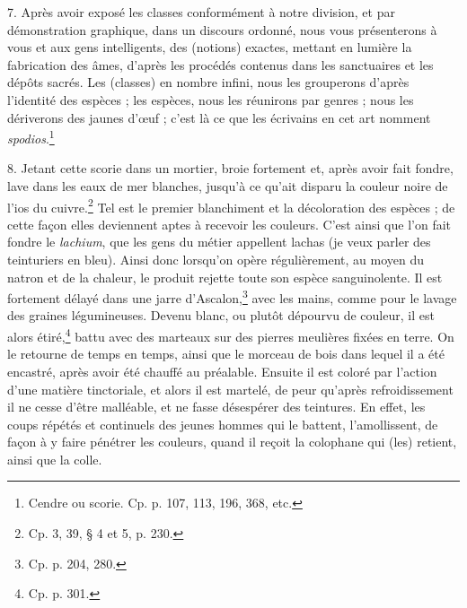 \documentclass[a4paper, 11pt, oneside, polutonikogreek, french]{article}
\begin{document}
7. Après avoir exposé les classes conformément à notre division, et par démonstration graphique, dans un discours ordonné, nous vous présenterons à vous et aux gens intelligents, des (notions) exactes, mettant en lumière la fabrication des âmes, d'après les procédés contenus dans les sanctuaires et les dépôts sacrés. Les (classes) en nombre infini, nous les grouperons d'après l'identité des espèces ; les espèces, nous les réunirons par genres ; nous les dériverons des jaunes d'œuf ; c'est là ce que les écrivains en cet art nomment \emph{spodios}.\footnote{Cendre ou scorie. Cp. p. 107, 113, 196, 368, etc.}

8. Jetant cette scorie dans un mortier, broie fortement et, après avoir fait fondre, lave dans les eaux de mer blanches, jusqu'à ce qu'ait disparu la couleur noire de l'ios du cuivre.\footnote{Cp. 3, 39, § 4 et 5, p. 230.} Tel est le premier blanchiment et la décoloration des espèces ; de cette façon elles deviennent aptes à recevoir les couleurs. C'est ainsi que l'on fait fondre le \emph{lachium}, que les gens du métier appellent lachas (je veux parler des teinturiers en bleu). Ainsi donc lorsqu'on opère régulièrement, au moyen du natron et de la chaleur, le produit rejette toute son espèce sanguinolente. Il est fortement délayé dans une jarre d'Ascalon,\footnote{Cp. p. 204, 280.} avec les mains, comme pour le lavage des graines légumineuses. Devenu blanc, ou plutôt dépourvu de couleur, il est alors étiré,\footnote{Cp. p. 301.} battu avec des marteaux sur des pierres meulières fixées en terre. On le retourne de temps en temps, ainsi que le morceau de bois dans lequel il a été encastré, après avoir été chauffé au préalable. Ensuite il est coloré par l'action d'une matière tinctoriale, et alors il est martelé, de peur qu'après refroidissement il ne cesse d'être malléable, et ne fasse désespérer des teintures. En effet, les coups répétés et continuels des jeunes hommes qui le battent, l'amollissent, de façon à y faire pénétrer les couleurs, quand il reçoit la colophane qui (les) retient, ainsi que la colle.
\end{document}
